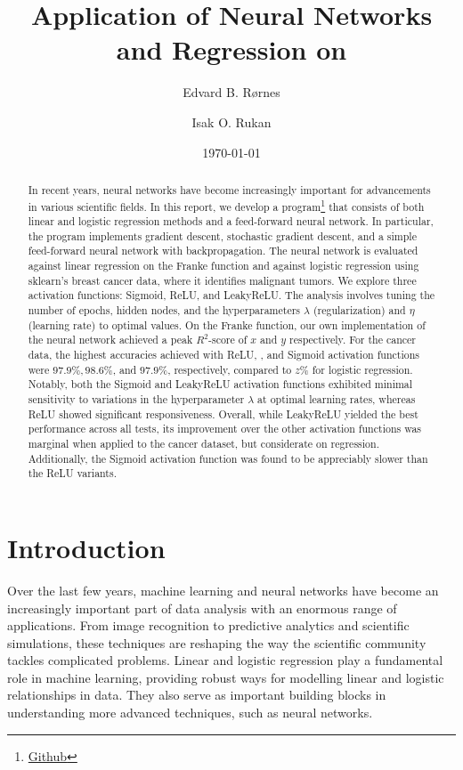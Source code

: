 \documentclass[%
reprint,s
amsmath,amssymb,
aps,
]{revtex4-2}
\begin{document}
	
\title{Application of Neural Networks and Regression on}
\author{Edvard B. Rørnes}
\author{Isak O. Rukan}
\date{\today}

\begin{abstract}
	In recent years, neural networks have become increasingly important for advancements in various scientific fields. In this report, we develop a program\footnote{\href{https://github.com/EdvardRornes/FYS-STK4155/tree/main/Project1}{Github}} that consists of both linear and logistic regression methods and a feed-forward neural network. In particular, the program implements gradient descent, stochastic gradient descent, and a simple feed-forward neural network with backpropagation. The neural network is evaluated against linear regression on the Franke function and against logistic regression using sklearn's breast cancer data, where it identifies malignant tumors. We explore three activation functions: Sigmoid, ReLU, and LeakyReLU. The analysis involves tuning the number of epochs, hidden nodes, and the hyperparameters $\lambda$ (regularization) and $\eta$ (learning rate) to optimal values. On the Franke function, our own implementation of the neural network achieved a peak $R^2$-score of $x$ and $y$ respectively. For the cancer data, the highest accuracies achieved with ReLU, , and Sigmoid activation functions were $97.9\%, 98.6\%$, and $97.9\%$, respectively, compared to $z\%$ for logistic regression. Notably, both the Sigmoid and LeakyReLU activation functions exhibited minimal sensitivity to variations in the hyperparameter $\lambda$ at optimal learning rates, whereas ReLU showed significant responsiveness. Overall, while LeakyReLU yielded the best performance across all tests, its improvement over the other activation functions was marginal when applied to the cancer dataset, but considerate on regression. Additionally, the Sigmoid activation function was found to be appreciably slower than the ReLU variants.
\end{abstract}

\maketitle

\section{Introduction}
Over the last few years, machine learning and neural networks have become an increasingly important part of data analysis with an enormous range of applications. From image recognition to predictive analytics and scientific simulations, these techniques are reshaping the way the scientific community tackles complicated problems. Linear and logistic regression play a fundamental role in machine learning, providing robust ways for modelling linear and logistic relationships in data. They also serve as important building blocks in understanding more advanced techniques, such as neural networks. 
\end{document}

